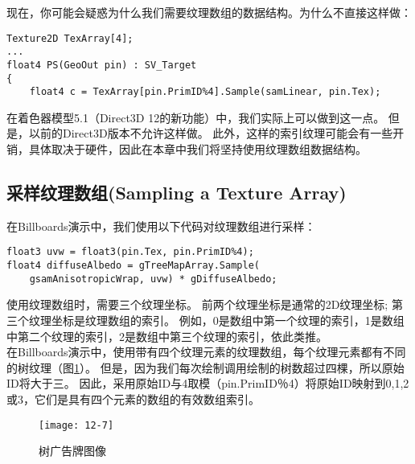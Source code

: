 \begin{flushleft}
现在，你可能会疑惑为什么我们需要纹理数组的数据结构。为什么不直接这样做：\\
\end{flushleft}

\begin{lstlisting}
Texture2D TexArray[4];
...
float4 PS(GeoOut pin) : SV_Target
{
    float4 c = TexArray[pin.PrimID%4].Sample(samLinear, pin.Tex);
\end{lstlisting}

\begin{flushleft}
在着色器模型5.1（Direct3D 12的新功能）中，我们实际上可以做到这一点。 但是，以前的Direct3D版本不允许这样做。 此外，这样的索引纹理可能会有一些开销，具体取决于硬件，因此在本章中我们将坚持使用纹理数组数据结构。\\
\end{flushleft}

\subsection{采样纹理数组(Sampling a Texture Array)}
\begin{flushleft}
在Billboards演示中，我们使用以下代码对纹理数组进行采样：\\
\end{flushleft}

\begin{lstlisting}
float3 uvw = float3(pin.Tex, pin.PrimID%4);
float4 diffuseAlbedo = gTreeMapArray.Sample(
    gsamAnisotropicWrap, uvw) * gDiffuseAlbedo;
\end{lstlisting}

\begin{flushleft}
使用纹理数组时，需要三个纹理坐标。 前两个纹理坐标是通常的2D纹理坐标; 第三个纹理坐标是纹理数组的索引。 例如，0是数组中第一个纹理的索引，1是数组中第二个纹理的索引，2是数组中第三个纹理的索引，依此类推。\\
在Billboards演示中，使用带有四个纹理元素的纹理数组，每个纹理元素都有不同的树纹理（图\ref{fig:12-7}）。 但是，因为我们每次绘制调用绘制的树数超过四棵，所以原始ID将大于三。 因此，采用原始ID与4取模（pin.PrimID％4）将原始ID映射到0,1,2或3，它们是具有四个元素的数组的有效数组索引。\\
\end{flushleft}

\begin{figure}[h]
    \texttt{[image: 12-7]}
    \centering
    \caption{树广告牌图像}
    \label{fig:12-7}
\end{figure}

